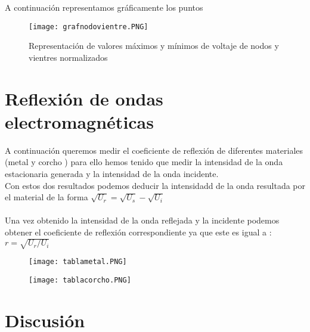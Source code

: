 \documentclass[a4paper,10pt,twocolumns]{article}
\begin{document}
A continuación representamos gráficamente los puntos 

\begin{figure}[H]
\centering
\caption{Representación de valores máximos y mínimos de voltaje de nodos y vientres normalizados}
\texttt{[image: grafnodovientre.PNG]}
\end{figure}


\section{Reflexión de ondas electromagnéticas}
A continuación queremos medir el coeficiente de reflexión de diferentes materiales (metal y corcho ) para ello hemos tenido que medir la intensidad de la onda estacionaria generada y la intensidad de la onda incidente. \\
Con estos dos resultados podemos deducir la intensidadd de la onda resultada por el material de la forma $\sqrt{U_r}=\sqrt{U_s}-\sqrt{U_i}$\\ 
\\
Una vez obtenido la intensidad de la onda reflejada y la incidente podemos obtener el coeficiente de reflexión correspondiente ya que este es igual a :
$r=\sqrt{U_r/U_i}$

\begin{figure}[H]
\centering
\texttt{[image: tablametal.PNG]}
\end{figure}

\begin{figure}[H]
\centering
\texttt{[image: tablacorcho.PNG]}
\end{figure}












\section{Discusión}
\end{document}

